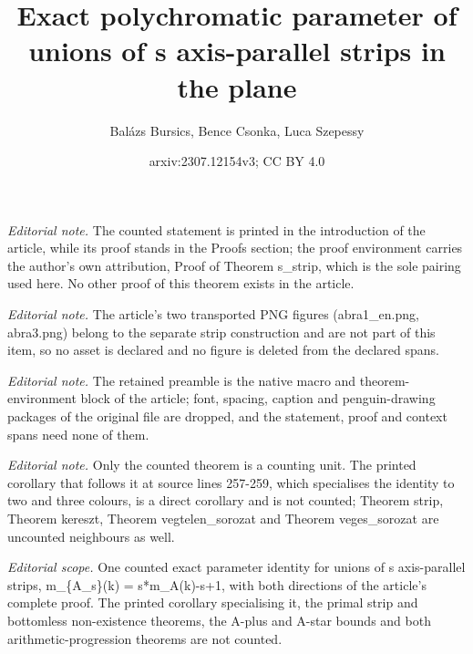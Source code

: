 \documentclass[10pt,a4paper]{amsart}
\title{Exact polychromatic parameter of unions of s axis-parallel strips in the plane}
\author{Balázs Bursics, Bence Csonka, Luca Szepessy}
\date{arxiv:2307.12154v3; CC BY 4.0}
\begin{document}
\maketitle
\noindent\textit{Editorial note.} The counted statement is printed in the introduction of the article, while its proof stands in the Proofs section; the proof environment carries the author's own attribution, Proof of Theorem s\_strip, which is the sole pairing used here. No other proof of this theorem exists in the article.\par\medskip
\noindent\textit{Editorial note.} The article's two transported PNG figures (abra1\_en.png, abra3.png) belong to the separate strip construction and are not part of this item, so no asset is declared and no figure is deleted from the declared spans.\par\medskip
\noindent\textit{Editorial note.} The retained preamble is the native macro and theorem-environment block of the article; font, spacing, caption and penguin-drawing packages of the original file are dropped, and the statement, proof and context spans need none of them.\par\medskip
\noindent\textit{Editorial note.} Only the counted theorem is a counting unit. The printed corollary that follows it at source lines 257-259, which specialises the identity to two and three colours, is a direct corollary and is not counted; Theorem strip, Theorem kereszt, Theorem vegtelen\_sorozat and Theorem veges\_sorozat are uncounted neighbours as well.\par\medskip
\noindent\textit{Editorial scope.} One counted exact parameter identity for unions of s axis-parallel strips, m\_\{A\_s\}(k) = s*m\_A(k)-s+1, with both directions of the article's complete proof. The printed corollary specialising it, the primal strip and bottomless non-existence theorems, the A-plus and A-star bounds and both arithmetic-progression theorems are not counted.\par\medskip
\end{document}
